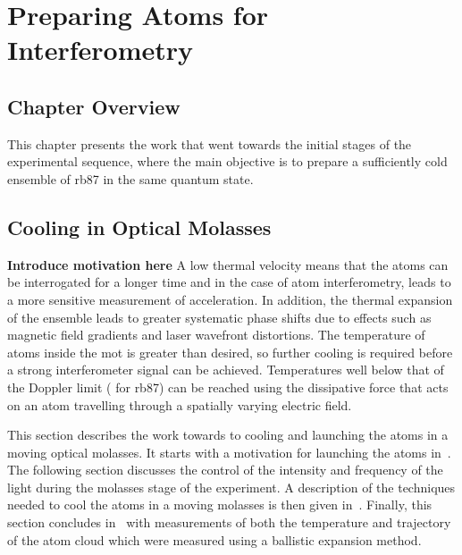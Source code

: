 \chapter{Preparing Atoms for Interferometry}\label{chap:atom_prep}
\section{Chapter Overview}
This chapter presents the work that went towards the initial stages of the experimental sequence, where the main objective is to prepare a sufficiently cold ensemble of \ac{rb87} in the same quantum state.


\section{Cooling in Optical Molasses}\label{sec:optical_molasses}
{\textbf{Introduce motivation here}}
A low thermal velocity means that the atoms can be interrogated for a longer time and in the case of atom interferometry, leads to a more sensitive measurement of acceleration. In addition, the thermal expansion of the ensemble leads to greater systematic phase shifts due to effects such as magnetic field gradients and laser wavefront distortions. The temperature of atoms inside the \ac{mot} is greater than desired, so further cooling is required before a strong interferometer signal can be achieved. Temperatures well below that of the Doppler limit ( for \ac{rb87}) can be reached using the dissipative force that acts on an atom travelling through a spatially varying electric field. 

\par\noindent
This section describes the work towards to cooling and launching the atoms in a moving optical molasses. It starts with a motivation for launching the atoms in~. The following section discusses the control of the intensity and frequency of the light during the molasses stage of the experiment. A description of the techniques needed to cool the atoms in a moving molasses is then given in~. Finally, this section concludes in~ with measurements of both the temperature and trajectory of the atom cloud which were measured using a ballistic expansion method.


